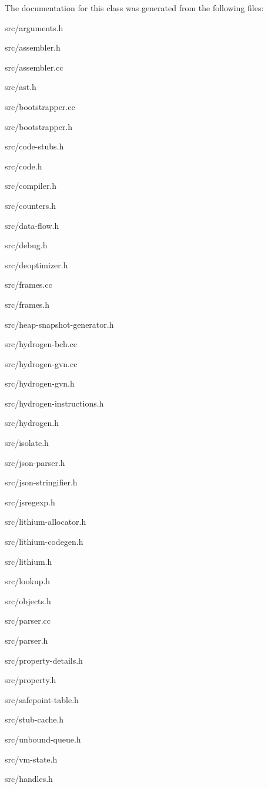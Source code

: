 The documentation for this class was generated from the following files\+:\begin{DoxyCompactItemize}
\item 
src/arguments.\+h\item 
src/assembler.\+h\item 
src/assembler.\+cc\item 
src/ast.\+h\item 
src/bootstrapper.\+cc\item 
src/bootstrapper.\+h\item 
src/code-\/stubs.\+h\item 
src/code.\+h\item 
src/compiler.\+h\item 
src/counters.\+h\item 
src/data-\/flow.\+h\item 
src/debug.\+h\item 
src/deoptimizer.\+h\item 
src/frames.\+cc\item 
src/frames.\+h\item 
src/heap-\/snapshot-\/generator.\+h\item 
src/hydrogen-\/bch.\+cc\item 
src/hydrogen-\/gvn.\+cc\item 
src/hydrogen-\/gvn.\+h\item 
src/hydrogen-\/instructions.\+h\item 
src/hydrogen.\+h\item 
src/isolate.\+h\item 
src/json-\/parser.\+h\item 
src/json-\/stringifier.\+h\item 
src/jsregexp.\+h\item 
src/lithium-\/allocator.\+h\item 
src/lithium-\/codegen.\+h\item 
src/lithium.\+h\item 
src/lookup.\+h\item 
src/objects.\+h\item 
src/parser.\+cc\item 
src/parser.\+h\item 
src/property-\/details.\+h\item 
src/property.\+h\item 
src/safepoint-\/table.\+h\item 
src/stub-\/cache.\+h\item 
src/unbound-\/queue.\+h\item 
src/vm-\/state.\+h\item 
src/handles.\+h\end{DoxyCompactItemize}
